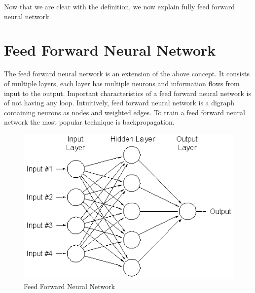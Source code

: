 \par
Now that we are clear with the definition, we now explain fully feed forward neural network.
\section{Feed Forward Neural Network}
The feed forward neural network is an extension of the above concept. It consists of multiple layers, each layer has multiple neurons and information flows from input to the output. Important characteristics of a feed forward neural network is of not having any loop. Intuitively, feed forward neural network is a digraph containing neurons as nodes and weighted edges. To train a feed forward neural network the most popular technique is backpropagation.
\begin{figure}[H]
  \centering
    \includegraphics[scale=.6, angle=0]{Files/FFNN.png}
    \caption[Feed Forward Neural Network]{Feed Forward Neural Network}
    \label{fig:FFNN}
\end{figure}

